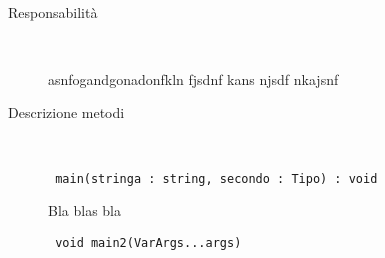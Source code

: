 		\paragraph*{}
		\label{MyClass}
		\begin{tcolorbox}[fonttitle=\bfseries, 
								adjusted title={\Large MyClass}, 
								breakable, 
								sharp corners=south,
								colback=white, 
								colframe=white!60!black]
								
				\begin{description}%
				
					\item[Responsabilità] \ \par 
        				asnfogandgonadonfkln fjsdnf kans njsdf nkajsnf 
        				
        			\tcbline 
        				
        			\item[Descrizione metodi] \ \par
        				
        				\begin{lstlisting}
 main(stringa : string, secondo : Tipo) : void
						\end{lstlisting}
						Bla blas bla 
						
						\begin{lstlisting}
 void main2(VarArgs...args)
						\end{lstlisting}
        				
				\end{description}  
				
			\end{tcolorbox}	
	

